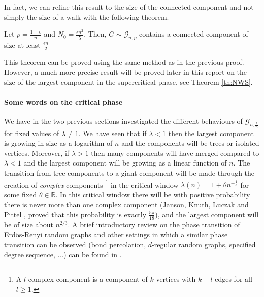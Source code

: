 In fact, we can refine this result to the size of the connected component and not simply the size of a walk with the following theorem.
\begin{theorem}
	Let $p = \frac{1+\epsilon}{n}$ and $N_0 = \frac{\epsilon n^2}{5}$. Then, $G \sim \mathcal{G}_{n,p}$ contains a connected component of size at least $\frac{\epsilon n}{2}$
\end{theorem}
This theorem can be proved using the same method as in the previous proof.
However, a much more precise result will be proved later in this report on the size of the largest component in the supercritical phase, see Theorem \ref{th:NWS}.
\paragraph{Some words on the critical phase}
We have in the two previous sections investigated the different behaviours of $\mathcal{G}_{n, \frac{\lambda}{n}}$ for fixed values of $\lambda \neq 1$.
We have seen that if $\lambda < 1$ then the largest component is growing in size as a logarithm of $n$ and the components will be trees or isolated vertices.
Moreover, if $\lambda > 1$ then many components will have merged compared to $\lambda <1$ and the largest component will be growing as a linear function of $n$.
The transition from tree components to a giant component will be made through the creation of \emph{complex} components
\footnote{A $l$-complex component is a component of $k$ vertices with $k+l$ edges for all $l \geq 1$.}
in the critical window $\lambda(n) = 1 + \theta n^{-\frac{1}{3}}$ for some fixed $\theta \in \mathbb{R}$.
In this critical window there will be with positive probability there is never more than one complex component (Janson, Knuth, Luczak and Pittel \cite{JansonKnuth}, proved that this probability is exactly $\frac{5\pi}{18}$), and the largest component will be of size about $n^{2/3}$.
A brief introductory review on the phase transition of Erd\"os-Renyi random graphs and other settings in which a similar phase transition can be observed (bond percolation, $d$-regular random graphs, specified degree sequence, ...) can be found in \cite{Spencer09}.


